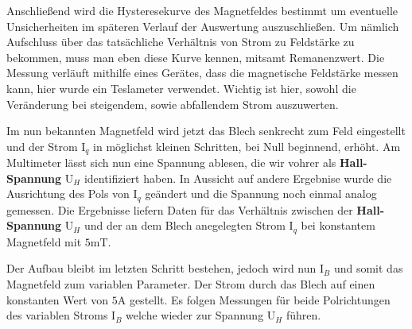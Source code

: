 Anschließend wird die Hysteresekurve %
des Magnetfeldes bestimmt um eventuelle Unsicherheiten im späteren Verlauf der Auswertung auszuschließen. Um nämlich Aufschluss über das 
tatsächliche Verhältnis von Strom zu Feldstärke zu bekommen, muss man eben diese Kurve kennen, mitsamt  Remanenzwert. %
Die Messung verläuft mithilfe eines Gerätes, dass die magnetische Feldstärke messen kann, hier wurde ein Teslameter verwendet.   
Wichtig ist hier, sowohl die Veränderung bei steigendem, sowie abfallendem Strom auszuwerten.  \\ \flushleft

Im nun bekannten Magnetfeld wird jetzt das Blech senkrecht zum Feld eingestellt und der Strom $\text{I}_q$ in möglichst kleinen Schritten, bei Null beginnend, erhöht. 
Am Multimeter lässt sich nun eine Spannung ablesen, die wir vohrer als \textbf{Hall-Spannung} $\text{U}_H$  identifiziert haben. In Aussicht auf andere Ergebnise 
wurde die Ausrichtung des Pols von $\text{I}_q$ geändert und die Spannung noch einmal analog gemessen. Die Ergebnisse liefern Daten für das Verhältnis zwischen 
der \textbf{Hall-Spannung} $\text{U}_H$ und der an dem Blech anegelegten Strom $\text{I}_q$ bei konstantem Magnetfeld mit $5$m$\si{\tesla}$.\\ \flushleft

Der Aufbau bleibt im letzten Schritt bestehen, jedoch wird nun $\text{I}_B$ und somit das Magnetfeld zum variablen Parameter. Der Strom durch das Blech auf einen 
konstanten Wert von $5\si{\ampere}$ gestellt. Es folgen Messungen für beide Polrichtungen des variablen Stroms $\text{I}_B$ welche wieder zur Spannung $\text{U}_H$ führen.
                                                                                                                    
                                                      